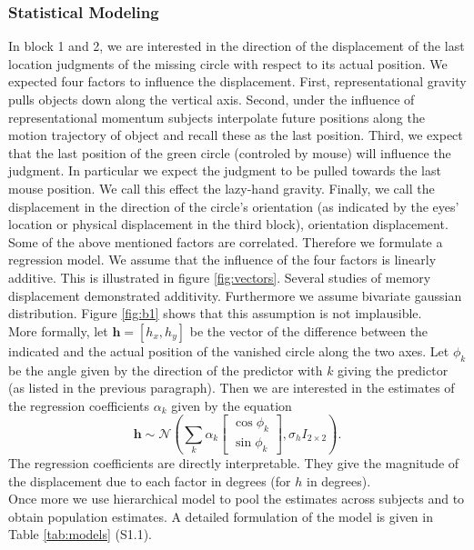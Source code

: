 \documentclass[10pt]{article}
\begin{document}
\subsubsection*{Statistical Modeling} 
In block 1 and 2, we are interested in the direction of the displacement of the last location judgments of the missing circle with respect to its actual position. 
We expected four factors to influence the displacement. First, representational gravity pulls objects down along the vertical axis. Second, under the influence of representational momentum subjects interpolate future positions along the motion trajectory of object and recall these as the last position. Third, we expect that the last position of the green circle (controled by mouse) will influence the judgment. In particular we expect the judgment to be pulled towards the last mouse position. We call this effect the lazy-hand gravity. 
Finally, we call the displacement in the direction of the circle's orientation (as indicated by the eyes' location or physical displacement in the third block), orientation displacement.\\
Some of the above mentioned factors are correlated. Therefore we formulate a regression model. 
We assume that the influence of the four factors is linearly additive. This is illustrated in figure \ref{fig:vectors}. 
Several studies of memory displacement demonstrated additivity.
Furthermore we assume bivariate gaussian distribution. Figure \ref{fig:b1} shows that this assumption is not implausible.\\ %
More formally, let $\mathbf h =[h_{x}, h_{y}]$ be the vector of the difference between the indicated and the actual position of the vanished circle along the two axes. Let $\phi_{k}$ be the angle given by the direction of the predictor with $k$ giving the predictor (as listed in the previous paragraph). Then we are interested in the estimates of the regression coefficients $\alpha_k$ given by the equation\\
\begin{equation}
\mathbf h \sim  \mathcal{N}\left(\sum_k \alpha_k \begin{bmatrix} \cos \phi_{k} \\ \sin \phi_{k} \end{bmatrix}, \sigma_h I_{2 \times 2} \right).
\end{equation} 
The regression coefficients are directly interpretable. They give the magnitude of the displacement due to each factor in degrees (for $h$ in degrees).\\
Once more we use hierarchical model to pool the estimates across subjects and to obtain population estimates. A detailed formulation of the model is given in Table \ref{tab:models} (S1.1).
\end{document}
